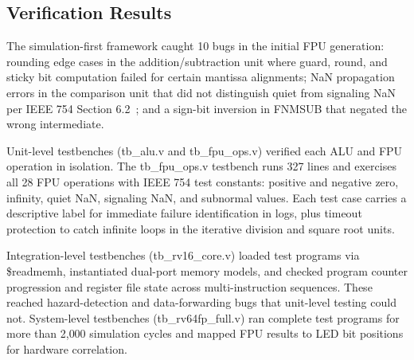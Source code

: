 \documentclass[journal]{IEEEtran}
\begin{document}
\begin{table}[!t]
\caption{Design Metrics for All Processor Variants}
\label{tab:design_metrics}
\centering
{}
\end{table}

\subsection{Verification Results}

The simulation-first framework caught 10 bugs in the initial FPU generation: rounding edge cases in the addition/subtraction unit where guard, round, and sticky bit computation failed for certain mantissa alignments; NaN propagation errors in the comparison unit that did not distinguish quiet from signaling NaN per IEEE 754 Section 6.2~\cite{ieee754_2019}; and a sign-bit inversion in FNMSUB that negated the wrong intermediate.

Unit-level testbenches (tb\_alu.v and tb\_fpu\_ops.v) verified each ALU and FPU operation in isolation. The tb\_fpu\_ops.v testbench runs 327 lines and exercises all 28 FPU operations with IEEE 754 test constants: positive and negative zero, infinity, quiet NaN, signaling NaN, and subnormal values. Each test case carries a descriptive label for immediate failure identification in logs, plus timeout protection to catch infinite loops in the iterative division and square root units.

Integration-level testbenches (tb\_rv16\_core.v) loaded test programs via \$readmemh, instantiated dual-port memory models, and checked program counter progression and register file state across multi-instruction sequences. These reached hazard-detection and data-forwarding bugs that unit-level testing could not. System-level testbenches (tb\_rv64fp\_full.v) ran complete test programs for more than 2{,}000 simulation cycles and mapped FPU results to LED bit positions for hardware correlation.
\end{document}
